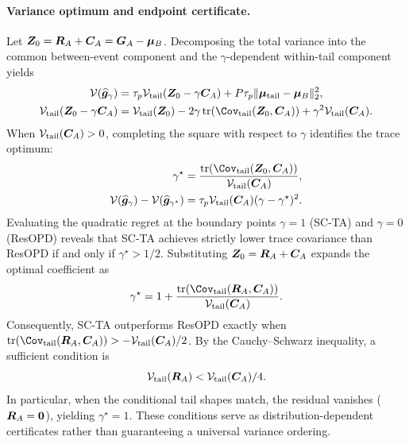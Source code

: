 \paragraph{Variance optimum and endpoint certificate.}
Let $\bm{Z}_0 = \bm{R}_A + \bm{C}_A = \bm{G}_A - \bm{\mu}_B$. Decomposing the total variance into the common between-event component and the $\gamma$-dependent within-tail component yields
\begin{equation}
  \begin{aligned}
    \mathcal{V}(\widehat{\bgrad}_\gamma)
    &= \tau_p \mathcal{V}_{\mathrm{tail}}(\bz_0 - \gamma \bfluct_A) + P\tau_p \lVert\bmean_{\mathrm{tail}} - \bmean_B\rVert_2^2, \\
    \mathcal{V}_{\mathrm{tail}}(\bz_0 - \gamma \bfluct_A)
    &= \mathcal{V}_{\mathrm{tail}}(\bz_0) - 2\gamma \operatorname{tr}\!\left(\Cov_{\mathrm{tail}}(\bz_0, \bfluct_A)\right) + \gamma^2 \mathcal{V}_{\mathrm{tail}}(\bfluct_A).
  \end{aligned}
  \label{eq:event-scta-total-var}
\end{equation}
When $\mathcal{V}_{\mathrm{tail}}(\bm{C}_A) > 0$, completing the square with respect to $\gamma$ identifies the trace optimum:
\begin{equation}
  \begin{aligned}
    \gamma^\star
    &= \frac{\operatorname{tr}\!\left(\Cov_{\mathrm{tail}}(\bz_0, \bfluct_A)\right)}{\mathcal{V}_{\mathrm{tail}}(\bfluct_A)}, \\
    \mathcal{V}(\widehat{\bgrad}_\gamma) - \mathcal{V}(\widehat{\bgrad}_{\gamma^\star})
    &= \tau_p \mathcal{V}_{\mathrm{tail}}(\bfluct_A) (\gamma - \gamma^\star)^2.
  \end{aligned}
  \label{eq:event-scta-regret}
\end{equation}
Evaluating the quadratic regret at the boundary points $\gamma = 1$ (SC-TA) and $\gamma = 0$ (ResOPD) reveals that SC-TA achieves strictly lower trace covariance than ResOPD if and only if $\gamma^\star > 1/2$. Substituting $\bm{Z}_0 = \bm{R}_A + \bm{C}_A$ expands the optimal coefficient as
\begin{equation}
  \gamma^\star = 1 + \frac{\operatorname{tr}\!\left(\Cov_{\mathrm{tail}}(\bresid_A, \bfluct_A)\right)}{\mathcal{V}_{\mathrm{tail}}(\bfluct_A)}.
  \label{eq:event-scta-gamma-residual}
\end{equation}
Consequently, SC-TA outperforms ResOPD exactly when $\operatorname{tr}\!\left(\Cov_{\mathrm{tail}}(\bresid_A, \bfluct_A)\right) > -\mathcal{V}_{\mathrm{tail}}(\bfluct_A)/2$. By the Cauchy--Schwarz inequality, a sufficient condition is
\begin{equation}
  \mathcal{V}_{\mathrm{tail}}(\bm{R}_A) < \mathcal{V}_{\mathrm{tail}}(\bm{C}_A)/4.
  \label{eq:event-improvement}
\end{equation}
In particular, when the conditional tail shapes match, the residual vanishes ($\bm{R}_A = \bm{0}$), yielding $\gamma^\star = 1$. These conditions serve as distribution-dependent certificates rather than guaranteeing a universal variance ordering.
